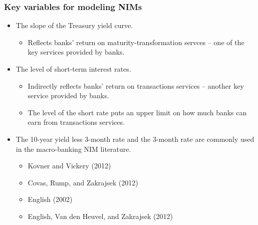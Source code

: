 \documentclass[handout]{beamer}
\begin{document}
\begin{frame}
\frametitle{Key variables for modeling NIMs}
\begin{itemize}
\item \vspace{0.0in} The slope of the Treasury yield curve.
\begin{itemize}
\item \vspace{0.05in} Reflects banks' return on maturity-transformation servces -- one of the key services provided by banks.
\end{itemize}
\item \vspace{0.1in} The level of short-term interest rates.
\begin{itemize}
\item \vspace{0.05in} Indirectly reflects banks' return on transactions services -- another key service provided by banks.
\item \vspace{0.05in} The level of the short rate puts an upper limit on how much banks can earn from transactions services.
\end{itemize}
\item \vspace{0.1in} The 10-year yield less 3-month rate and the 3-month rate are commonly used in the macro-banking NIM literature.
\begin{itemize}
\item \vspace{0.05in} Kovner and Vickery (2012)
\item \vspace{0.05in} Covas, Rump, and Zakrajsek (2012)
\item \vspace{0.05in} English (2002)
\item \vspace{0.05in} English, Van den Heuvel, and Zakrajsek (2012)
\end{itemize}
\end{itemize}
\end{frame}
\end{document}

